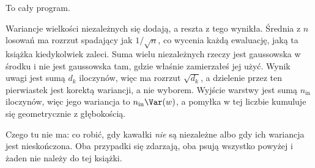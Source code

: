 \begin{fr}
To cały program.

Wariancje wielkości niezależnych się dodają, a reszta z tego wynikła. Średnia
z $n$ losowań ma rozrzut spadający jak $1/\sqrt{n}$, co wycenia każdą
ewaluację, jaką ta książka kiedykolwiek zaleci. Suma wielu niezależnych rzeczy
jest gaussowska w środku i nie jest gaussowska tam, gdzie właśnie zamierzałeś
jej użyć. Wynik uwagi jest sumą $d_k$ iloczynów, więc ma rozrzut
$\sqrt{d_k}$, a dzielenie przez ten pierwiastek jest korektą wariancji, a nie
wyborem. Wyjście warstwy jest sumą $n_{\text{in}}$ iloczynów, więc jego
wariancja to $n_{\text{in}}\Var(w)$, a pomyłka w tej liczbie kumuluje się
geometrycznie z głębokością.


Czego tu nie ma: co robić, gdy kawałki \emph{nie} są niezależne albo gdy ich
wariancja jest nieskończona. Oba przypadki się zdarzają, oba psują wszystko
powyżej i żaden nie należy do tej książki.
\end{fr}

